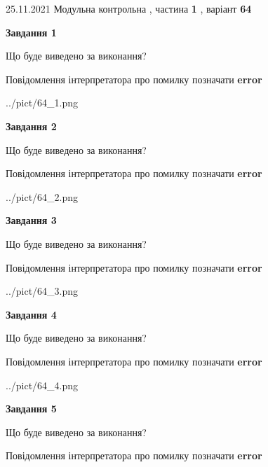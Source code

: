 \documentclass[10pt, ukrainian]{article}
\begin{document}
{25.11.2021 Модульна контрольна , частина \textbf { 1 }, варіант  \No \textbf { 64 }\par}
{
\begin {large}

{\begin {center}\textbf{Завдання 1}\end {center}}\par
Що буде виведено за виконання? \par
Повідомлення інтерпретатора про помилку позначати \textbf{error}

\begin{center}
	{../pict/64_1.png}
\end{center}
\newpage

{\begin {center}\textbf{Завдання 2}\end {center}}\par
Що буде виведено за виконання? \par
Повідомлення інтерпретатора про помилку позначати \textbf{error}

\begin{center}
	{../pict/64_2.png}
\end{center}
\newpage

{\begin {center}\textbf{Завдання 3}\end {center}}\par
Що буде виведено за виконання? \par
Повідомлення інтерпретатора про помилку позначати \textbf{error}

\begin{center}
	{../pict/64_3.png}
\end{center}
\newpage

{\begin {center}\textbf{Завдання 4}\end {center}}\par
Що буде виведено за виконання? \par
Повідомлення інтерпретатора про помилку позначати \textbf{error}

\begin{center}
	{../pict/64_4.png}
\end{center}
\newpage

{\begin {center}\textbf{Завдання 5}\end {center}}\par
Що буде виведено за виконання? \par
Повідомлення інтерпретатора про помилку позначати \textbf{error}


\end{large}}
\end{document}
